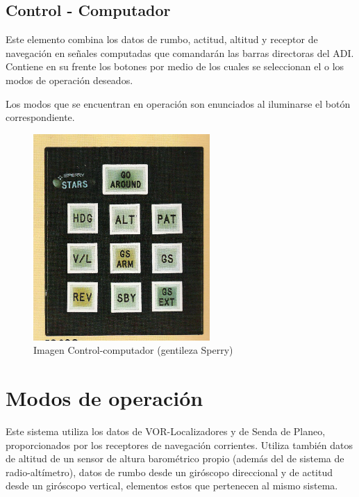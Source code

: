 \documentclass[a4paper,12pt,twoside]{article}
\begin{document}
\subsection{Control - Computador}
\label{sec:control.computador}

Este elemento combina los datos de rumbo, actitud, altitud y receptor de 
navegaci\'on en se\~nales computadas que comandar\'an las barras
directoras del ADI.
Contiene en su frente los botones por medio de los cuales se
seleccionan el o los modos de operaci\'on deseados.

Los modos que se encuentran en operaci\'on son enunciados al iluminarse
el bot\'on correspondiente.


\begin{figure}[!h]
  \centering
  \includegraphics[width=0.6\textwidth]{imagenes/computadora_sperry.png}  
  \caption{Imagen Control-computador (gentileza Sperry)}
  \label{fig:computadora.sperry}
\end{figure}

\section{Modos de operaci\'on}
\label{sec:modos.operacion}

Este sistema utiliza los datos de VOR-Localizadores y de Senda de Planeo,
proporcionados por los receptores de navegaci\'on corrientes.
Utiliza tambi\'en datos de altitud de un sensor de altura barom\'etrico
propio (adem\'as del de sistema de radio-alt\'imetro), datos de rumbo
desde un gir\'oscopo direccional y de actitud desde un gir\'oscopo
vertical, elementos estos que pertenecen al mismo sistema.
\end{document}
